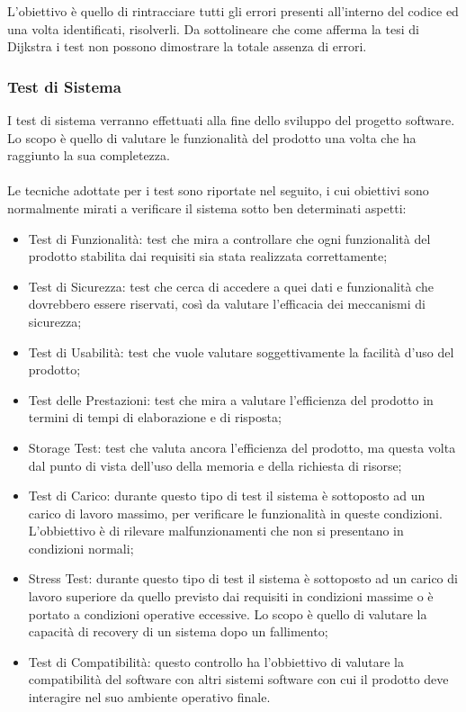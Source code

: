L'obiettivo \`e quello di rintracciare tutti gli errori presenti all'interno del
codice ed una volta identificati, risolverli. Da sottolineare che come afferma la tesi di Dijkstra 
i test non possono dimostrare la totale assenza di errori.

\subsubsection{Test di Sistema}
I test di sistema verranno effettuati alla fine dello sviluppo del progetto
software. Lo scopo \`e quello di valutare le funzionalit\`a del prodotto una volta 
che ha raggiunto la sua completezza.\\ \\ 
Le tecniche adottate per i test sono riportate nel seguito, i cui obiettivi sono 
normalmente mirati a verificare il sistema sotto ben determinati aspetti:

\begin{itemize}
  \item Test di Funzionalit\`a: test che mira a controllare che ogni
  funzionalit\`a del prodotto stabilita dai requisiti sia stata realizzata correttamente;
  \item Test di Sicurezza: test che cerca di accedere a quei dati e
  funzionalit\`a che dovrebbero essere riservati, cos\`i da valutare l'efficacia dei meccanismi di sicurezza;
  \item Test di Usabilit\`a:  test che vuole valutare soggettivamente la facilit\`a
  d'uso del prodotto;
  \item Test delle Prestazioni: test che mira a valutare l'efficienza del
  prodotto in termini di tempi di elaborazione e di risposta;
  \item Storage Test: test che valuta ancora l'efficienza del
  prodotto, ma questa volta dal punto di vista dell'uso della memoria e della
  richiesta di risorse;
  \item Test di Carico: durante questo tipo di test il sistema \`e sottoposto ad
  un carico di lavoro massimo, per verificare le funzionalit\`a in queste
  condizioni. L'obbiettivo \`e di rilevare malfunzionamenti che non si presentano in condizioni normali;
  \item Stress Test: durante questo tipo di test il sistema \`e sottoposto ad un
  carico di lavoro superiore da quello previsto dai requisiti in condizioni
  massime o \`e portato a condizioni operative eccessive. Lo scopo \`e quello di valutare la capacit\`a di recovery di un sistema dopo un fallimento;
  \item Test di Compatibilit\`a: questo controllo ha l'obbiettivo di valutare la
  compatibilit\`a del software con altri sistemi software con cui il prodotto deve interagire nel suo ambiente operativo finale.
 \end{itemize}


